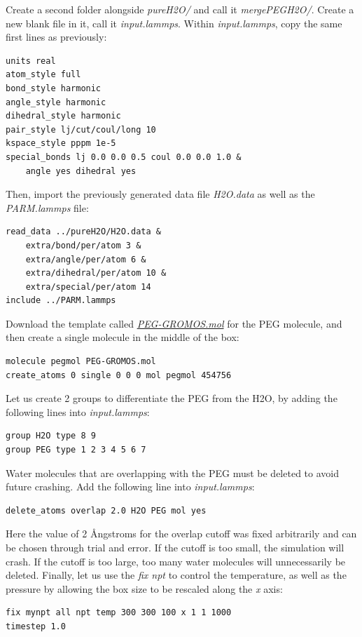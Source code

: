 \documentclass[9pt,tutorial]{livecoms}
\begin{document}
Create a second folder alongside \textit{pureH2O/} and call it \textit{mergePEGH2O/}. Create a new blank file in it,
call it \textit{input.lammps}. Within \textit{input.lammps}, copy the same first lines as previously:
{\normalsize \begin{verbatim}
units real
atom_style full
bond_style harmonic
angle_style harmonic
dihedral_style harmonic
pair_style lj/cut/coul/long 10
kspace_style pppm 1e-5
special_bonds lj 0.0 0.0 0.5 coul 0.0 0.0 1.0 &
    angle yes dihedral yes
\end{verbatim}}
Then, import the previously generated data file \textit{H2O.data} as well as the \textit{PARM.lammps} file:
{\normalsize \begin{verbatim}
read_data ../pureH2O/H2O.data &
    extra/bond/per/atom 3 &
    extra/angle/per/atom 6 &
    extra/dihedral/per/atom 10 &
    extra/special/per/atom 14
include ../PARM.lammps
\end{verbatim}}
Download the template called \href{https://raw.githubusercontent.com/lammpstutorials/lammpstutorials-article/main/files/tutorial3/PEG-GROMOS.mol}{\textit{PEG-GROMOS.mol}} for the PEG molecule, and then create a single molecule in the middle of the box:
{\normalsize \begin{verbatim}
molecule pegmol PEG-GROMOS.mol
create_atoms 0 single 0 0 0 mol pegmol 454756
\end{verbatim}}
Let us create 2 groups to differentiate the PEG from the H2O, by adding the following lines into \textit{input.lammps}:
{\normalsize \begin{verbatim}
group H2O type 8 9
group PEG type 1 2 3 4 5 6 7
\end{verbatim}}
Water molecules that are overlapping with the PEG must be deleted to avoid future crashing. Add the following line into \textit{input.lammps}:
{\normalsize \begin{verbatim}
delete_atoms overlap 2.0 H2O PEG mol yes
\end{verbatim}}
Here the value of 2 Ångstroms for the overlap cutoff was fixed arbitrarily and can be chosen through trial and error. If the cutoff is too small, the simulation will crash. If the cutoff is too large, too many water molecules will unnecessarily be deleted. Finally, let us use the \textit{fix npt} to control the temperature, as well as the pressure by allowing the box size to be rescaled along the \textit{x} axis:
{\normalsize \begin{verbatim}
fix mynpt all npt temp 300 300 100 x 1 1 1000
timestep 1.0
\end{verbatim}}
\end{document}
